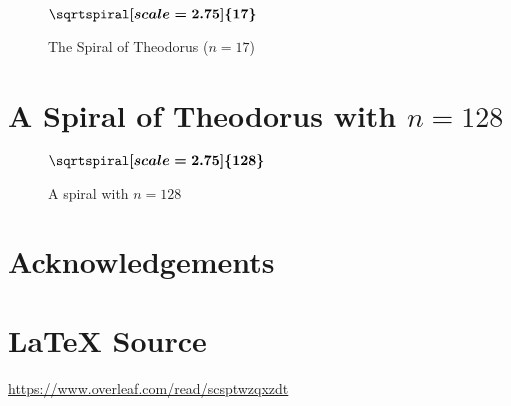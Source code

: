 \documentclass{article}
\theoremstyle{definition}
\begin{document}
{                                                           %
}                                                                               %
%
%
%
\def \numberoftriangles {17}													%
%
%
%
\bigskip
\begin{figure}[H]																%
        \centering																%
        \resizebox{0.60 \textwidth}{!} {                                        %
        	$\boldmath{\sqrtspiral[scale=2.75]{\numberoftriangles}}$			%
        }                                                                       %
\caption{The Spiral of Theodorus ($n = \numberoftriangles$)}
\label{fig:the_spiral_of_theodorus}
\end{figure}
%
%
\def \numberoftriangles {128}													%
%
%
%
\section{A Spiral of Theodorus with $n = \numberoftriangles$}
%
%
%
\bigskip
\begin{figure}[H]																%
        \centering																%
        \resizebox{0.75 \textwidth}{!} {                                        %
        	$\boldmath{\sqrtspiral[scale=2.75]{\numberoftriangles}}$			%
        }                                                                       %
\caption{A spiral with $n = \numberoftriangles$}
\end{figure}
%
%
%
%
\bigskip
\section*{Acknowledgements}
%
%
\section*{\LaTeX \hspace{0.10 mm} Source}
\url{https://www.overleaf.com/read/scsptwzqxzdt}
%
%
%


%
%
\end{document}
